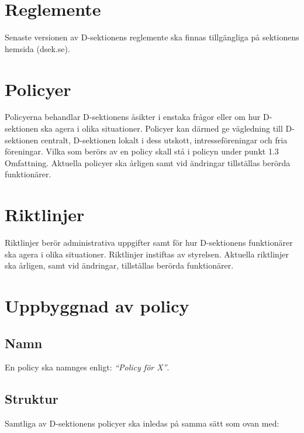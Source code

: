 \documentclass[]{dsekprotokoll}
\begin{document}
\section{Reglemente}
Senaste versionen av D-sektionens reglemente ska finnas tillgängliga på sektionens hemsida (dsek.se).

\section{Policyer}
Policyerna behandlar D-sektionens åsikter i enstaka frågor eller om hur D-sektionen ska agera i olika situationer. Policyer kan därmed ge vägledning till D-sektionen centralt, D-sektionen lokalt i dess
utskott, intresseföreningar och fria föreningar. Vilka som berörs av en policy skall stå i policyn under punkt 1.3 Omfattning. Aktuella policyer ska årligen samt vid ändringar tillställas berörda funktionärer.

\section{Riktlinjer}
Riktlinjer berör administrativa uppgifter samt för hur D-sektionens funktionärer ska agera i olika situationer. Riktlinjer instiftas av styrelsen. Aktuella riktlinjer ska årligen, samt vid ändringar, tillställas berörda funktionärer.

\section{Uppbyggnad av policy}

\subsection{Namn}

En policy ska namnges enligt: \textit{``Policy för X''}.

\subsection{Struktur}

Samtliga av D-sektionens policyer ska inledas på samma sätt som ovan med:
\end{document}
